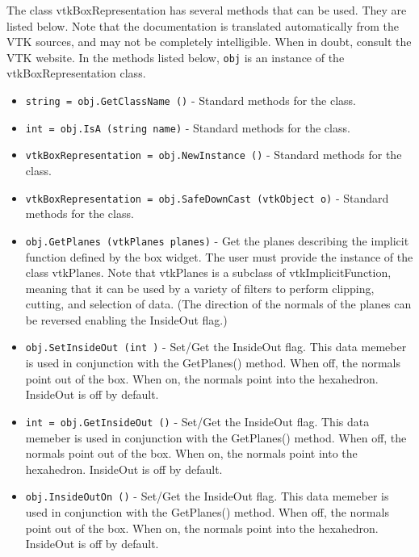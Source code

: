 The class vtkBoxRepresentation has several methods that can be used.
  They are listed below.
Note that the documentation is translated automatically from the VTK sources,
and may not be completely intelligible.  When in doubt, consult the VTK website.
In the methods listed below, \verb|obj| is an instance of the vtkBoxRepresentation class.
\begin{itemize}
\item  \verb|string = obj.GetClassName ()| -  Standard methods for the class.

\item  \verb|int = obj.IsA (string name)| -  Standard methods for the class.

\item  \verb|vtkBoxRepresentation = obj.NewInstance ()| -  Standard methods for the class.

\item  \verb|vtkBoxRepresentation = obj.SafeDownCast (vtkObject o)| -  Standard methods for the class.

\item  \verb|obj.GetPlanes (vtkPlanes planes)| -  Get the planes describing the implicit function defined by the box
 widget. The user must provide the instance of the class vtkPlanes. Note
 that vtkPlanes is a subclass of vtkImplicitFunction, meaning that it can
 be used by a variety of filters to perform clipping, cutting, and
 selection of data.  (The direction of the normals of the planes can be
 reversed enabling the InsideOut flag.)

\item  \verb|obj.SetInsideOut (int )| -  Set/Get the InsideOut flag. This data memeber is used in conjunction
 with the GetPlanes() method. When off, the normals point out of the
 box. When on, the normals point into the hexahedron.  InsideOut is off
 by default.

\item  \verb|int = obj.GetInsideOut ()| -  Set/Get the InsideOut flag. This data memeber is used in conjunction
 with the GetPlanes() method. When off, the normals point out of the
 box. When on, the normals point into the hexahedron.  InsideOut is off
 by default.

\item  \verb|obj.InsideOutOn ()| -  Set/Get the InsideOut flag. This data memeber is used in conjunction
 with the GetPlanes() method. When off, the normals point out of the
 box. When on, the normals point into the hexahedron.  InsideOut is off
 by default.


\end{itemize}
